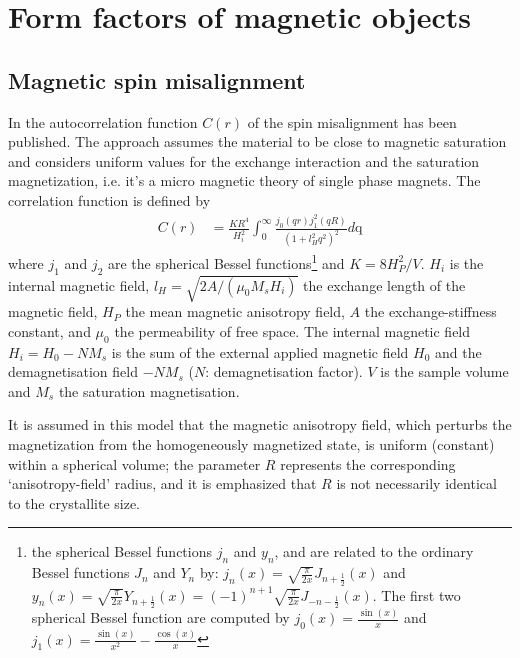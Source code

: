 \clearpage
\section{Form factors of magnetic objects} \hspace{1pt}
\label{sec:magneticstructures}

\clearpage

\subsection{Magnetic spin misalignment} \hspace{1pt}
\label{sec:spinmisalignment}

In \cite{Michels2013} the autocorrelation function $C(r)$ of the
spin misalignment has been published. The approach assumes the
material to be close to magnetic saturation and considers uniform
values for the exchange interaction and the saturation
magnetization, i.e. it's a micro magnetic theory of single phase
magnets. The correlation function is defined by
\begin{align}
C(r) & = \frac{K R^4}{H_i^2} \int_0^\infty
\frac{j_0(qr)j_1^2(qR)}{\left(1+l_H^2q^2\right)^2} d\text{q}
\end{align}
where $j_1$ and $j_2$ are the spherical Bessel
functions\footnote{the spherical Bessel functions $j_n$ and $y_n$,
and are related to the ordinary Bessel functions $J_n$ and $Y_n$ by:
 $j_{n}(x) = \sqrt{\frac{\pi}{2x}} J_{n+\frac{1}{2}}(x)$ and $
 y_{n}(x) = \sqrt{\frac{\pi}{2x}} Y_{n+\frac{1}{2}}(x) = (-1)^{n+1}
 \sqrt{\frac{\pi}{2x}}J_{-n-\frac{1}{2}}(x)$.
 The first two spherical Bessel function are computed by
 $j_0(x)=\frac{\sin(x)} {x}$ and
 $j_1(x)=\frac{\sin(x)} {x^2}- \frac{\cos(x)} {x}$} and $K=8H_P^2/V$.
 $H_i$ is the internal magnetic field, $l_H=\sqrt{2A/(\mu_0 M_s H_i)}$
 the exchange length of the magnetic field, $H_P$ the mean magnetic
 anisotropy field, $A$ the exchange-stiffness constant, and $\mu_0$
 the permeability of free space. The internal magnetic field
 $H_i=H_0-NM_s$ is the sum of the external applied magnetic field
 $H_0$ and the demagnetisation field $-NM_s$ ($N$: demagnetisation
 factor). $V$ is the sample volume and $M_s$ the saturation
 magnetisation.

It is assumed in this model that the magnetic anisotropy field,
which perturbs the magnetization from the homogeneously magnetized
state, is uniform (constant) within a spherical volume; the
parameter $R$ represents the corresponding ‘anisotropy-field’
radius, and it is emphasized that $R$ is not necessarily identical
to the crystallite size.


